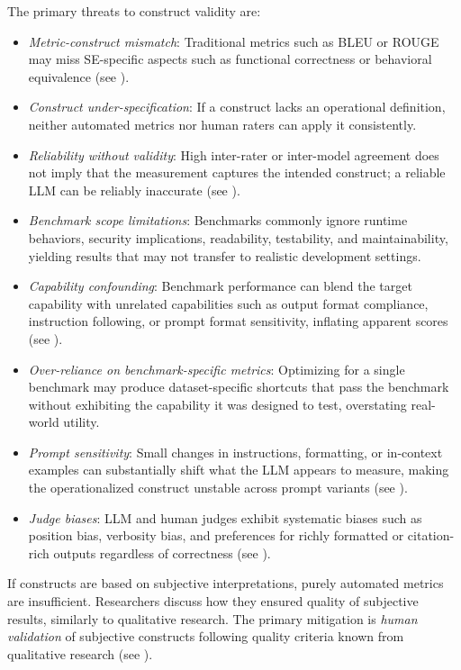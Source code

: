 The primary threats to construct validity are:
\begin{itemize}
	\item \emph{Metric-construct mismatch}: Traditional metrics such as BLEU or ROUGE may miss SE-specific aspects such as functional correctness or behavioral equivalence (see \benchmarksmetrics).
	\item \emph{Construct under-specification}: If a construct lacks an operational definition, neither automated metrics nor human raters can apply it consistently.
	\item \emph{Reliability without validity}: High inter-rater or inter-model agreement does not imply that the measurement captures the intended construct; a reliable LLM can be reliably inaccurate (see \humanvalidation).
	\item \emph{Benchmark scope limitations}: Benchmarks commonly ignore runtime behaviors, security implications, readability, testability, and maintainability, yielding results that may not transfer to realistic development settings.
	\item \emph{Capability confounding}: Benchmark performance can blend the target capability with unrelated capabilities such as output format compliance, instruction following, or prompt format sensitivity, inflating apparent scores (see \benchmarksmetrics).
	\item \emph{Over-reliance on benchmark-specific metrics}: Optimizing for a single benchmark may produce dataset-specific shortcuts that pass the benchmark without exhibiting the capability it was designed to test, overstating real-world utility.
	\item \emph{Prompt sensitivity}: Small changes in instructions, formatting, or in-context examples can substantially shift what the LLM appears to measure, making the operationalized construct unstable across prompt variants (see \design).
	\item \emph{Judge biases}: LLM and human judges exhibit systematic biases such as position bias, verbosity bias, and preferences for richly formatted or citation-rich outputs regardless of correctness (see \humanvalidation).
\end{itemize}

If constructs are based on subjective interpretations, purely automated metrics are insufficient. Researchers \must discuss how they ensured quality of subjective results, similarly to qualitative research. The primary mitigation is \emph{human validation} of subjective constructs following quality criteria known from qualitative research (see \humanvalidation).

